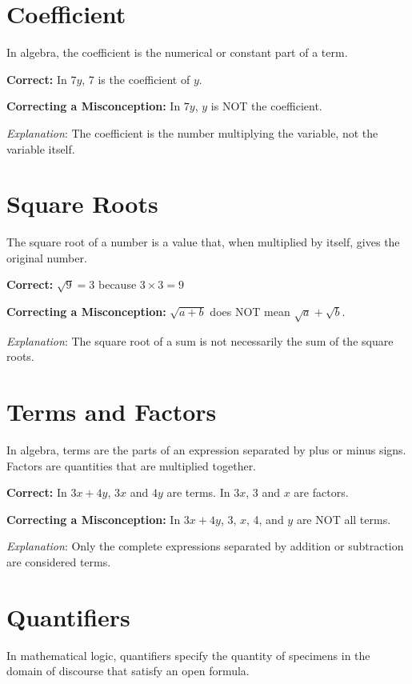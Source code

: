 \documentclass[12pt]{article}
\begin{document}
\section*{Coefficient}

In algebra, the coefficient is the numerical or constant part of a term.

\textbf{Correct:} In \(7y\), 7 is the coefficient of \(y\).

\textbf{Correcting a Misconception:} In \(7y\), \(y\) is NOT the coefficient.

\textit{Explanation}: The coefficient is the number multiplying the variable, not the variable itself.

\section*{Square Roots}

The square root of a number is a value that, when multiplied by itself, gives the original number.

\textbf{Correct:} \(\sqrt{9} = 3\) because \(3 \times 3 = 9\)

\textbf{Correcting a Misconception:} \(\sqrt{a + b}\) does NOT mean \(\sqrt{a} + \sqrt{b}\).

\textit{Explanation}: The square root of a sum is not necessarily the sum of the square roots.

\section*{Terms and Factors}

In algebra, terms are the parts of an expression separated by plus or minus signs. Factors are quantities that are multiplied together.

\textbf{Correct:} In \(3x + 4y\), \(3x\) and \(4y\) are terms. In \(3x\), 3 and \(x\) are factors.

\textbf{Correcting a Misconception:} In \(3x + 4y\), 3, \(x\), 4, and \(y\) are NOT all terms.

\textit{Explanation}: Only the complete expressions separated by addition or subtraction are considered terms.

\section*{Quantifiers}

In mathematical logic, quantifiers specify the quantity of specimens in the domain of discourse that satisfy an open formula.
\end{document}
